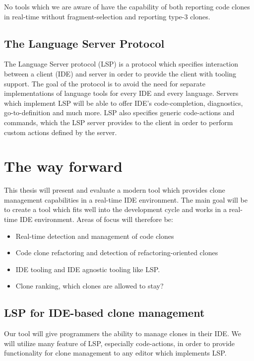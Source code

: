 \documentclass[12pt]{article}
\begin{document}
No tools which we are aware of have the capability of both reporting code clones in
real-time without fragment-selection and reporting type-3 clones.

\subsection{The Language Server Protocol}

The Language Server protocol (LSP) is a protocol which specifies interaction between a
client (IDE) and server in order to provide the client with tooling support. The goal of
the protocol is to avoid the need for separate implementations of language tools for every
IDE and every language. Servers which implement LSP will be able to offer IDE's
code-completion, diagnostics, go-to-definition and much more. LSP also specifies generic
code-actions and commands, which the LSP server provides to the client in order to perform
custom actions defined by the server.

\section{The way forward}

This thesis will present and evaluate a modern tool which provides clone management
capabilities in a real-time IDE environment. The main goal will be to create a tool which
fits well into the development cycle and works in a real-time IDE environment. Areas of
focus will therefore be:

\begin{itemize}
	\item Real-time detection and management of code clones
	\item Code clone refactoring and detection of refactoring-oriented clones
	\item IDE tooling and IDE agnostic tooling like LSP.
	\item Clone ranking, which clones are allowed to stay?
\end{itemize}

\subsection{LSP for IDE-based clone management}

Our tool will give programmers the ability to manage clones in their IDE. We will utilize
many feature of LSP, especially code-actions, in order to provide functionality for clone
management to any editor which implements LSP.
\end{document}

